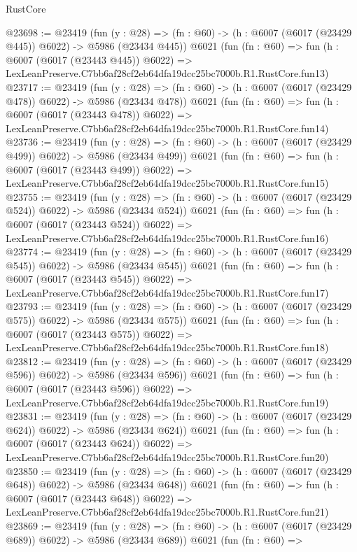 \begin{lexlean}{RustCore}
\begin{coremodule}
@23698 := @23419
    (fun (y : @28) => (fn : @60) -> (h : @6007 (@6017 (@23429 @445)) @6022) -> @5986 (@23434 @445))
    @6021
    (fun (fn : @60) =>
    fun (h : @6007 (@6017 (@23443 @445)) @6022) =>
    LexLeanPreserve.C7bb6af28cf2eb64dfa19dcc25bc7000b.R1.RustCore.fun13)
@23717 := @23419
    (fun (y : @28) => (fn : @60) -> (h : @6007 (@6017 (@23429 @478)) @6022) -> @5986 (@23434 @478))
    @6021
    (fun (fn : @60) =>
    fun (h : @6007 (@6017 (@23443 @478)) @6022) =>
    LexLeanPreserve.C7bb6af28cf2eb64dfa19dcc25bc7000b.R1.RustCore.fun14)
@23736 := @23419
    (fun (y : @28) => (fn : @60) -> (h : @6007 (@6017 (@23429 @499)) @6022) -> @5986 (@23434 @499))
    @6021
    (fun (fn : @60) =>
    fun (h : @6007 (@6017 (@23443 @499)) @6022) =>
    LexLeanPreserve.C7bb6af28cf2eb64dfa19dcc25bc7000b.R1.RustCore.fun15)
@23755 := @23419
    (fun (y : @28) => (fn : @60) -> (h : @6007 (@6017 (@23429 @524)) @6022) -> @5986 (@23434 @524))
    @6021
    (fun (fn : @60) =>
    fun (h : @6007 (@6017 (@23443 @524)) @6022) =>
    LexLeanPreserve.C7bb6af28cf2eb64dfa19dcc25bc7000b.R1.RustCore.fun16)
@23774 := @23419
    (fun (y : @28) => (fn : @60) -> (h : @6007 (@6017 (@23429 @545)) @6022) -> @5986 (@23434 @545))
    @6021
    (fun (fn : @60) =>
    fun (h : @6007 (@6017 (@23443 @545)) @6022) =>
    LexLeanPreserve.C7bb6af28cf2eb64dfa19dcc25bc7000b.R1.RustCore.fun17)
@23793 := @23419
    (fun (y : @28) => (fn : @60) -> (h : @6007 (@6017 (@23429 @575)) @6022) -> @5986 (@23434 @575))
    @6021
    (fun (fn : @60) =>
    fun (h : @6007 (@6017 (@23443 @575)) @6022) =>
    LexLeanPreserve.C7bb6af28cf2eb64dfa19dcc25bc7000b.R1.RustCore.fun18)
@23812 := @23419
    (fun (y : @28) => (fn : @60) -> (h : @6007 (@6017 (@23429 @596)) @6022) -> @5986 (@23434 @596))
    @6021
    (fun (fn : @60) =>
    fun (h : @6007 (@6017 (@23443 @596)) @6022) =>
    LexLeanPreserve.C7bb6af28cf2eb64dfa19dcc25bc7000b.R1.RustCore.fun19)
@23831 := @23419
    (fun (y : @28) => (fn : @60) -> (h : @6007 (@6017 (@23429 @624)) @6022) -> @5986 (@23434 @624))
    @6021
    (fun (fn : @60) =>
    fun (h : @6007 (@6017 (@23443 @624)) @6022) =>
    LexLeanPreserve.C7bb6af28cf2eb64dfa19dcc25bc7000b.R1.RustCore.fun20)
@23850 := @23419
    (fun (y : @28) => (fn : @60) -> (h : @6007 (@6017 (@23429 @648)) @6022) -> @5986 (@23434 @648))
    @6021
    (fun (fn : @60) =>
    fun (h : @6007 (@6017 (@23443 @648)) @6022) =>
    LexLeanPreserve.C7bb6af28cf2eb64dfa19dcc25bc7000b.R1.RustCore.fun21)
@23869 := @23419
    (fun (y : @28) => (fn : @60) -> (h : @6007 (@6017 (@23429 @689)) @6022) -> @5986 (@23434 @689))
    @6021
    (fun (fn : @60) =>

\end{coremodule}
\end{lexlean}

